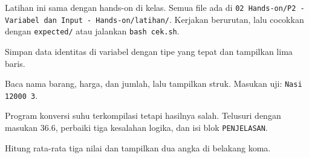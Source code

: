 \documentclass[a4paper]{article}
\begin{document}
Latihan ini sama dengan hands-on di kelas. Semua file ada di \texttt{02 Hands-on/P2 - Variabel dan Input - Hands-on/latihan/}. Kerjakan berurutan, lalu cocokkan dengan \texttt{expected/} atau jalankan \texttt{bash cek.sh}.
\par\vspace{4pt}\par\vspace{6pt}
Simpan data identitas di variabel dengan tipe yang tepat dan tampilkan lima baris.

Baca nama barang, harga, dan jumlah, lalu tampilkan struk. Masukan uji: \texttt{Nasi 12000 3}.

Program konversi suhu terkompilasi tetapi hasilnya salah. Telusuri dengan masukan 36.6, perbaiki tiga kesalahan logika, dan isi blok \texttt{PENJELASAN}.

Hitung rata-rata tiga nilai dan tampilkan dua angka di belakang koma.
\end{document}
